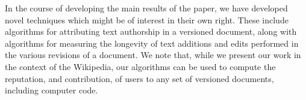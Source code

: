 In the course of developing the main results of the paper, we have
developed novel techniques which might be of interest in their own
right. 
These include algorithms for attributing text authorship in a
versioned document, along with algorithms for measuring the longevity
of text additions and edits performed in the various revisions of a
document. 
We note that, while we present our work in the context of the
Wikipedia, our algorithms can be used to compute the reputation, and
contribution, of users to any set of versioned documents, including
computer code. 


